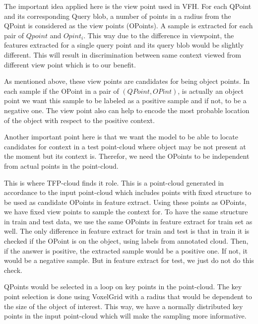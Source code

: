 The important idea applied here is the view point used in VFH.
For each QPoint and its corresponding Query blob, a number of points in a radius from the QPoint is considered as the view points 
(OPoints).
A sample is extracted for each pair of $Qpoint$ and $Opint_i$.
This way due to the difference in viewpoint, the features extracted for a single query point and its query blob would be slightly 
different. 
This will result in discrimination between same context viewed from different view point which is to our benefit.

As mentioned above, these view points are candidates for being object points.
In each sample if the OPoint in a pair of $(QPoint,OPint)$, is actually an object point we want this sample to be labeled as 
a positive sample and if not, to be a negative one. 
The view point also can help to encode the most probable location of the object with respect to the positive context. 

Another important point here is that we want the model to be able to locate candidates for context in a test point-cloud where 
object may be not present at the moment but its context is.
Therefor, we need the OPoints to be independent from actual points in the point-cloud.

This is where TFP-cloud finds it role.
This is a point-cloud generated in accordance to the input point-cloud which includes points with fixed structure to be used as 
candidate OPoints in feature extract.
Using these points as OPoints, we have fixed view points to sample the context for. 
To have the same structure in train and test data, we use the same OPoints in feature extract for train set as well.
The only difference in feature extract for train and test is that in train it is checked if the OPoint is on the object, using 
labels from annotated cloud. 
Then, if the answer is positive, the extracted sample would be a positive one. 
If not, it would be a negative sample. 
But in feature extract for test, we just do not do this check.

QPoints would be selected in a loop on key points in the point-cloud. 
The key point selection is done using VoxelGrid with a radius that would be dependent to the size of the object of interest. 
This way, we have a normally distributed key points in the input point-cloud which will make the sampling more informative.

